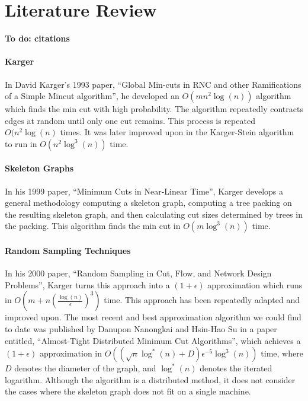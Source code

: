 \documentclass[12pt]{article}
\begin{document}
\section*{Literature Review}

\textbf{To do: citations}

\paragraph{Karger} In David Karger's 1993 paper, ``Global Min-cuts in RNC and other Ramifications of a Simple Mincut algorithm'', he developed an $O(m n^2 \log(n))$ algorithm which finds the min cut with high probability. The algorithm repeatedly contracts edges at random until only one cut remains. This process is repeated $O(n^2 \log(n)$ times. It was later improved upon in the Karger-Stein algorithm \cite{Karger, David R; Stein, Clifford (1996). ``A new approach to the minimum cut problem''} to run in $O(n^2 \log^3(n))$ time.

\paragraph{Skeleton Graphs} In his 1999 paper, ``Minimum Cuts in Near-Linear Time'', Karger develops a general methodology computing a skeleton graph, computing a tree packing on the resulting skeleton graph, and then calculating cut sizes determined by trees in the packing. This algorithm finds the min cut in $O(m \log^3(n))$ time.

\paragraph{Random Sampling Techniques} In his 2000 paper, ``Random Sampling in Cut, Flow, and Network Design Problems'', Karger turns this approach into a $(1+\epsilon)$ approximation which runs in $O(m + n(\frac{\log(n)}{\epsilon})^3)$ time. This approach has been repeatedly adapted and improved upon. The most recent and best approximation algorithm we could find to date was published by Danupon Nanongkai and Hsin-Hao Su in a paper entitled, ``Almost-Tight Distributed Minimum Cut Algorithms'', which achieves a $(1 + \epsilon)$ approximation in $O((\sqrt{n} \log^*(n) + D) \epsilon^{-5} \log^3(n))$ time, where $D$ denotes the diameter of the graph, and $\log^*(n)$ denotes the iterated logarithm. Although the algorithm is a distributed method, it does not consider the cases where the skeleton graph does not fit on a single machine.
\end{document}
